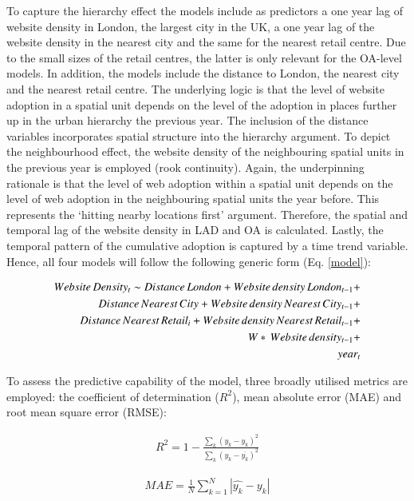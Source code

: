 \documentclass[
  authoryear,
  preprint,
  3p]{elsarticle}
\begin{document}
To capture the hierarchy effect the models include as predictors a one
year lag of website density in London, the largest city in the UK, a one
year lag of the website density in the nearest city and the same for the
nearest retail centre. Due to the small sizes of the retail centres, the
latter is only relevant for the OA-level models. In addition, the models
include the distance to London, the nearest city and the nearest retail
centre. The underlying logic is that the level of website adoption in a
spatial unit depends on the level of the adoption in places further up
in the urban hierarchy the previous year. The inclusion of the distance
variables incorporates spatial structure into the hierarchy argument. To
depict the neighbourhood effect, the website density of the neighbouring
spatial units in the previous year is employed (rook continuity). Again,
the underpinning rationale is that the level of web adoption within a
spatial unit depends on the level of web adoption in the neighbouring
spatial units the year before. This represents the `hitting nearby
locations first' argument. Therefore, the spatial and temporal lag of
the website density in LAD and OA is calculated. Lastly, the temporal
pattern of the cumulative adoption is captured by a time trend variable.
Hence, all four models will follow the following generic form (Eq.
\ref{model}):

\begin{align} \label{model}
Website\,Density_{t} \sim Distance\,London +
Website\,density\,London_{t-1} +\notag\\
Distance\,Nearest\,City +
Website\,density\,Nearest\,City_{t-1} +\notag\\
Distance\,Nearest\,Retail_{i} +
Website\,density\,Nearest\,Retail_{t-1} +\notag\\
W*\, Website\,density_{t-1} +\notag\\ 
year_{t}
\end{align}

To assess the predictive capability of the model, three broadly utilised
metrics are employed: the coefficient of determination (\(R^2\)), mean
absolute error (MAE) and root mean square error (RMSE):

\begin{align}
R^2 = 1 - \frac{\sum_{k} (y_{k} - \hat{y_{k}})^2} {\sum_{k} (y_{k} - \overline{y_{k}})^2} \label{eq:rsquared}
\end{align}

\begin{align}
MAE = \frac{1}{N} \sum_{k = 1}^{N} |\hat{y_{k}} - y_{k}| \label{eq:mae}
\end{align}
\end{document}
